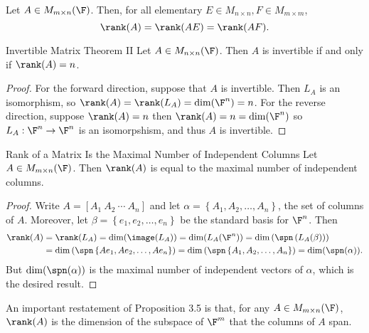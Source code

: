 \documentclass[linearalgebra]{subfiles}
\begin{document}
    \begin{cor}{}
        Let $A\in M_{m\times n}(\F)$. Then, for all elementary $E\in M_{n\times n}, F\in M_{m\times m}$,
        \begin{equation*}
            \rank(A) = \rank(AE) = \rank(AF).
        \end{equation*}
    \end{cor}	

    \begin{theorem}{Invertible Matrix Theorem II}
        Let $A\in M_{n\times n}(\F)$. Then $A$ is invertible if and only if $\rank(A) = n$.
    \end{theorem}
    
    \begin{proof}
        For the forward direction, suppose that $A$ is invertible. Then $L_A$ is an isomorphism, so $\rank(A) = \rank(L_A) = \dim (\F^n) = n$. For the reverse direction, suppose $\rank (A) = n$ then $\rank (A) = n = \dim( \F^n)$ so $L_A: \F^n\to \F^n$ is an isomorpshism, and thus $A$ is invertible.
    \end{proof}

    \begin{prop}{Rank of a Matrix Is the Maximal Number of Independent Columns}
        Let $A\in M_{m\times n}(\F)$. Then $\rank(A)$ is equal to the maximal number of independent columns.
    \end{prop}

    \begin{proof}
        Write $A = [A_1\ A_2\ \cdots \ A_n]$ and let $\alpha = \left\lbrace A_1, A_2, \ldots, A_n \right\rbrace$, the set of columns of $A$. Moreover, let $\beta = \left\lbrace e_1, e_2, \ldots, e_n \right\rbrace$ be the standard basis for $\F^n$. Then
        \begin{align*}
            \rank(A) & = \rank(L_A) = \dim (\image(L_A)) = \dim (L_A(\F^n)) = \dim \left(\spn \left(L_A(\beta)\right)\right) \\
                    & = \dim \left( \spn \left\lbrace Ae_1, Ae_2, \ldots, Ae_n \right\rbrace \right) = \dim \left( \spn \left\lbrace A_1, A_2, \ldots, A_n \right\rbrace \right) = \dim ( \spn(\alpha) ). 
        \end{align*}
        But $\dim(\spn(\alpha))$ is the maximal number of independent vectors of $\alpha$, which is the desired result.
    \end{proof}

    \begin{remark}
        An important restatement of Proposition 3.5 is that, for any $A\in M_{m\times n}(\F)$, $\rank(A)$ is the dimension of the subspace of $\F^m$ that the columns of $A$ span.
    \end{remark}
\end{document}
